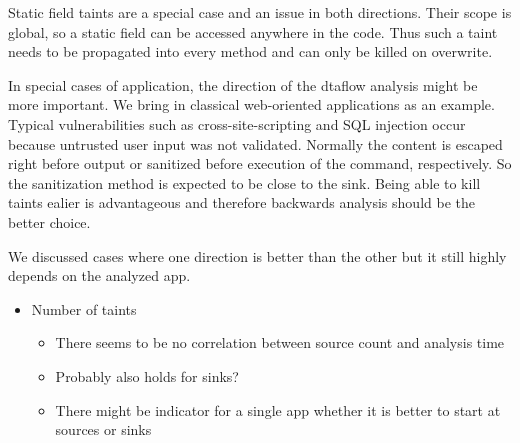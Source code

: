 \documentclass[../draft.tex]{subfiles}
\begin{document}
    Static field taints are a special case and an issue in both directions. Their scope is global, so a static field can be accessed anywhere in the code. Thus such a taint needs to be propagated into every method and can only be killed on overwrite.

    In special cases of application, the direction of the dtaflow analysis might be more important. We bring in classical web-oriented applications as an example. Typical vulnerabilities such as cross-site-scripting and SQL injection occur because untrusted user input was not validated. Normally the content is escaped right before output or sanitized before execution of the command, respectively. So the sanitization method is expected to be close to the sink. Being able to kill taints ealier is advantageous and therefore backwards analysis should be the better choice.

    We discussed cases where one direction is better than the other but it still highly depends on the analyzed app. 

    \begin{itemize}
        \item Number of taints
        \begin{itemize}
            \item There seems to be no correlation between source count and analysis time
            \item Probably also holds for sinks?
            \item There might be indicator for a single app whether it is better to start at sources or sinks
        \end{itemize}
    \end{itemize}
\end{document}
